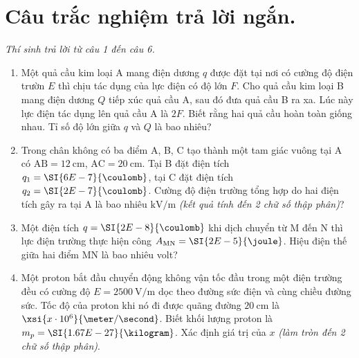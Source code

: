 \section{Câu trắc nghiệm trả lời ngắn.} \textit{Thí sinh trả lời từ câu 1 đến câu 6.}
\begin{enumerate}[label=\bfseries Câu \arabic*:]
	\item Một quả cầu kim loại A mang điện dương $q$ được đặt tại nơi có cường độ điện trườn $E$ thì chịu tác dụng của lực điện có độ lớn $F$. Cho quả cầu kim loại B mang điện dương $Q$ tiếp xúc quả cầu A, sau đó đưa quả cầu B ra xa. Lúc này lực điện tác dụng lên quả cầu A là $2F$. Biết rằng hai quả cầu hoàn toàn giống nhau. Tỉ số độ lớn giữa $q$ và $Q$ là bao nhiêu?
	\item Trong chân không có ba điểm A, B, C tạo thành một tam giác vuông tại A có $\text{AB}=\SI{12}{\centi\meter}$, $\text{AC}=\SI{20}{\centi\meter}$. Tại B đặt điện tích $q_1=\SI{6E-7}{\coulomb}$, tại C đặt điện tích $q_2=\SI{2E-7}{\coulomb}$. Cường độ điện trường tổng hợp do hai điện tích gây ra tại A là bao nhiêu $\si{\kilo\volt/\meter}$ \textit{(kết quả tính đến 2 chữ số thập phân)}?

\item Một điện tích $q=\SI{2E-8}{\coulomb}$ khi dịch chuyển từ M đến N thì lực điện trường thực hiện công $A_\text{MN}=\SI{2E-5}{\joule}$. Hiệu điện thế giữa hai điểm MN là bao nhiêu volt?

\item Một proton bắt đầu chuyển động không vận tốc đầu trong một điện trường đều có cường độ $E=\SI{2500}{\volt/\meter}$ dọc theo đường sức điện và cùng chiều đường sức. Tốc độ của proton khi nó đi được quãng đường $\SI{20}{\centi\meter}$ là $\xsi{x\cdot 10^6}{\meter/\second}$. Biết khối lượng proton là $m_p=\SI{1.67E-27}{\kilogram}$. Xác định giá trị của $x$ \textit{(làm tròn đến 2 chữ số thập phân)}.


\end{enumerate}
